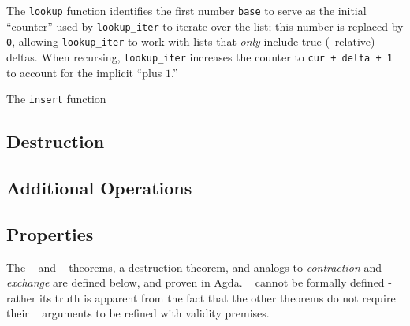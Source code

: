 The \verb+lookup+ function identifies the first number \verb+base+ to serve as the initial ``counter'' used by \verb+lookup_iter+ to iterate over the list; this number is replaced by \verb+0+, allowing \verb+lookup_iter+ to work with lists that \emph{only} include true (\ie{}~relative) deltas.
%
When recursing, \verb+lookup_iter+ increases the counter to \texttt{cur + delta + 1} to account for the implicit ``plus $1$.''

The \verb+insert+ function 


\subsection{Destruction}



\subsection{Additional Operations}




\subsection{Properties}
\label{sec:DD:props}


The \SemInj~ and \EqDec~ theorems, a destruction theorem, and analogs to \emph{contraction} and
\emph{exchange} are defined below, and proven in Agda. \SemTot~ cannot be formally defined - rather
its truth is apparent from the fact that the other theorems do not require their \dd~ arguments to
be refined with validity premises.

